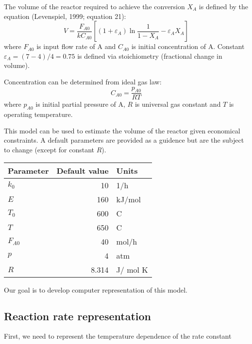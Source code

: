 \documentclass[listings, a4paper, fleqn, pdftex, 12pt, openany, oneside, final]{memoir}
\theoremstyle{definition}
\begin{document}
The volume of the reactor required to achieve the conversion \(X_{A}\) is
defined by the equation (Levenspiel, 1999; equation 21):
\begin{equation}
\label{eq:pfr-vol}
V=\frac{F_{A0}}{kC_{A0}}\left[(1+\varepsilon_{A})\ln{\frac{1}{1-X_{A}}} -\varepsilon_{A}X_{A}\right]
\end{equation}
where \(F_{A0}\) is input flow rate of A and \(C_{A0}\) is initial concentration
of A. Constant \(\varepsilon_{A}=(7-4)/4=0.75\) is defined via stoichiometry
(fractional change in volume).

Concentration can be determined from ideal gas law:
\begin{equation}
C_{A0}=\frac{p_{A0}}{RT}
\end{equation}
where \(p_{A0}\) is initial partial pressure of A, \(R\) is universal gas
constant and \(T\) is operating temperature.

This model can be used to estimate the volume of the reactor given
economical constraints. A default parameters are provided as a
guidence but are the subject to change (except for constant \(R\)).

\begin{center}
\begin{tabular}{lrl}
Parameter & Default value & Units\\
\hline
\(k_{0}\) & 10 & 1/h\\
\(E\) & 160 & kJ/mol\\
\(T_{0}\) & 600 & C\\
\(T\) & 650 & C\\
\(F_{A0}\) & 40 & mol/h\\
\(p\) & 4 & atm\\
\(R\) & 8.314 & J/ mol K\\
\end{tabular}
\end{center}


Our goal is to develop computer representation of this model.

\subsection{Reaction rate representation}
\label{sec:orgheadline2}
First, we need to represent the temperature dependence of the rate
constant
\end{document}
